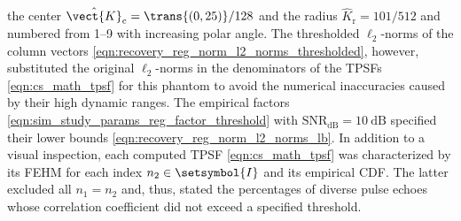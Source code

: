 the center
$\hat{\vect{K}}_{ \text{c} } = \trans{ ( 0, 25 ) } / 128$ and
the radius
$\hat{K}_{ \text{r} } = 101 / 512$ and numbered from
\numrange{1}{9} with
increasing polar angle. %
The thresholded $\ell_{2}$-norms of
the column vectors
\eqref{eqn:recovery_reg_norm_l2_norms_thresholded}, however, substituted
the original $\ell_{2}$-norms in
the denominators of
the \acp{TPSF}
\eqref{eqn:cs_math_tpsf} for
this phantom to avoid
the numerical inaccuracies caused by
their high dynamic ranges.
The empirical factors
\eqref{eqn:sim_study_params_reg_factor_threshold} with
$\text{SNR}_{\text{dB}} = \SI{10}{\deci\bel}$ specified
their lower bounds
\eqref{eqn:recovery_reg_norm_l2_norms_lb}.
In addition to
a visual inspection,
each computed \ac{TPSF}
\eqref{eqn:cs_math_tpsf} was characterized by
its \ac{FEHM} for
each index
$n_{2} \in \setsymbol{I}$ and
its empirical \ac{CDF}.
The latter excluded
all $n_{1} = n_{2}$ and, thus, stated
the percentages of
diverse pulse echoes whose
correlation coefficient did not exceed
a specified threshold.
